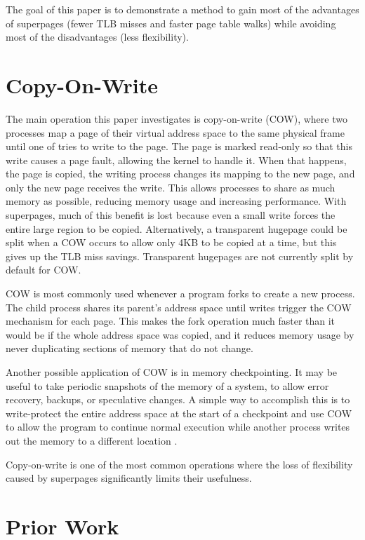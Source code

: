 The goal of this paper is to demonstrate a method to gain most of the advantages of superpages (fewer TLB misses and faster page table walks) while avoiding most of the disadvantages (less flexibility).

\section{Copy-On-Write}

The main operation this paper investigates is copy-on-write (COW), where two processes map a page of their virtual address space to the same physical frame until one of tries to write to the page. The page is marked read-only so that this write causes a page fault, allowing the kernel to handle it. When that happens, the page is copied, the writing process changes its mapping to the new page, and only the new page receives the write. This allows processes to share as much memory as possible, reducing memory usage and increasing performance. With superpages, much of this benefit is lost because even a small write forces the entire large region to be copied. Alternatively, a transparent hugepage could be split when a COW occurs to allow only 4KB to be copied at a time, but this gives up the TLB miss savings. Transparent hugepages are not currently split by default for COW.

COW is most commonly used whenever a program forks to create a new process. The child process shares its parent's address space until writes trigger the COW mechanism for each page. This makes the fork operation much faster than it would be if the whole address space was copied, and it reduces memory usage by never duplicating sections of memory that do not change.

Another possible application of COW is in memory checkpointing. It may be useful to take periodic snapshots of the memory of a system, to allow error recovery, backups, or speculative changes. A simple way to accomplish this is to write-protect the entire address space at the start of a checkpoint and use COW to allow the program to continue normal execution while another process writes out the memory to a different location \cite{Sun}.

Copy-on-write is one of the most common operations where the loss of flexibility caused by superpages significantly limits their usefulness.

\section{Prior Work}

